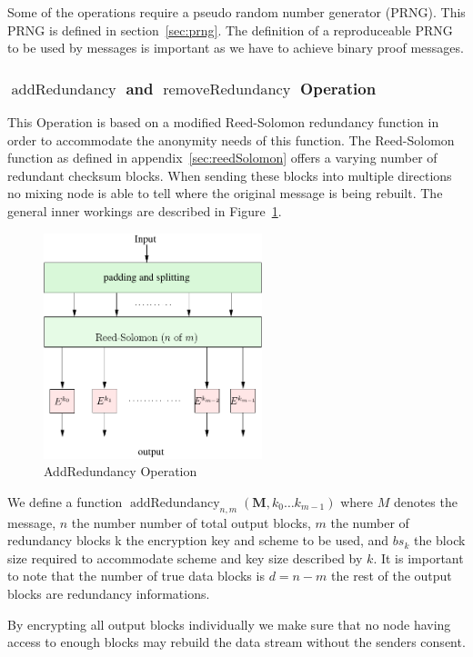 \documentclass[9pt,journal,compsoc]{IEEEtran}
\DeclareMathOperator{\addRedundancy}{addRedundancy}
\DeclareMathOperator{\removeRedundancy}{removeRedundancy}
\begin{document}
Some of the operations require a pseudo random number generator (PRNG). This PRNG is defined in section~\ref{sec:prng}. The definition of a reproduceable PRNG to be used by messages is important as we have to achieve binary proof messages.

\subsubsection{$\addRedundancy$ and $\removeRedundancy$ Operation}
This Operation is based on a modified Reed-Solomon redundancy function in order to accommodate the anonymity needs of this function. The Reed-Solomon function as defined in appendix~\ref{sec:reedSolomon} offers a varying number of redundant checksum blocks. When sending these blocks into multiple directions no mixing node is able to tell where the original message is being rebuilt. The general inner workings are described in Figure~\ref{fig:addRedundancy}.

\begin{figure}[!t]
	\centering
	\includegraphics[width=2.5in]{../inc/addRedundancyOp}
	\caption{AddRedundancy Operation}
	\label{fig:addRedundancy}
\end{figure}

We define a function $\addRedundancy_{n,m}( \mathbf{M},k_0\ldots k_{m-1} )$ where $M$ denotes the message, $n$ the number number of total output blocks, $m$ the number of redundancy blocks k the encryption key and scheme to be used, and $bs_k$ the block size required to accommodate scheme and key size described by $k$. It is important to note that the number of true data blocks is $d=n-m$ the rest of the output blocks are redundancy informations.

By encrypting all output blocks individually we make sure that no node having access to enough blocks may rebuild the data stream without the senders consent.
\end{document}
